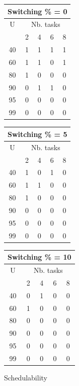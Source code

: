 \documentclass[a4paper,12pt]{article}
\begin{document}
\begin{figure}[H]
	\begin{center}
		\begin{tabular}{|c|c|c|c|c|}
		   \hline
		   \multicolumn{5}{|c|}{Switching \% = 0} \\
		   \hline
		   U& \multicolumn{4}{c|}{Nb. tasks} \\
		   \hline
		   &2&4&6&8\\
		   \hline
		   40&1&1&1&1\\
		   \hline
		   60&1&1&0&1\\
		   \hline
		   80&1&0&0&0\\
		   \hline
		   90&0&1&1&0\\
		   \hline
		   95&0&0&0&0\\
		   \hline
		   99&0&0&0&0\\
		   \hline
		\end{tabular}
		\hspace{2em}
		\begin{tabular}{|c|c|c|c|c|}
		   \hline
		   \multicolumn{5}{|c|}{Switching \% = 5} \\
		   \hline
		   U& \multicolumn{4}{c|}{Nb. tasks} \\
		   \hline
		   &2&4&6&8\\
		   \hline
		   40&1&0&1&0\\
		   \hline
		   60&1&1&0&0\\
		   \hline
		   80&1&0&0&0\\
		   \hline
		   90&0&0&0&0\\
		   \hline
		   95&0&0&0&0\\
		   \hline
		   99&0&0&0&0\\
		   \hline
		\end{tabular}
		\hspace{2em}
		\begin{tabular}{|c|c|c|c|c|}
		   \hline
		   \multicolumn{5}{|c|}{Switching \% = 10} \\
		   \hline
		   U& \multicolumn{4}{c|}{Nb. tasks} \\
		   \hline
		   &2&4&6&8\\
		   \hline
		   40&0&1&0&0\\
		   \hline
		   60&1&0&0&0\\
		   \hline
		   80&0&0&0&0\\
		   \hline
		   90&0&0&0&0\\
		   \hline
		   95&0&0&0&0\\
		   \hline
		   99&0&0&0&0\\
		   \hline
		\end{tabular}
	\end{center}
	\label{sched}
	\caption{Schedulability}
\end{figure}
\end{document}
